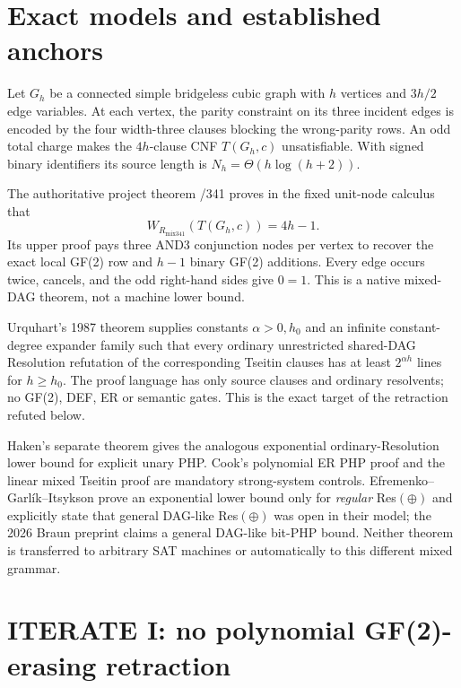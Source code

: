 \documentclass[11pt]{article}
\begin{document}
\section{Exact models and established anchors}

Let $G_h$ be a connected simple bridgeless cubic graph with $h$ vertices and $3h/2$ edge variables.  At each vertex, the parity constraint on its three incident edges is encoded by the four width-three clauses blocking the wrong-parity rows.  An odd total charge makes the $4h$-clause CNF $T(G_h,c)$ unsatisfiable.  With signed binary identifiers its source length is $N_h=\Theta(h\log(h+2))$.

The authoritative project theorem /341 proves in the fixed unit-node calculus that
\[
W_{R_{\mathrm{mix341}}}(T(G_h,c))=4h-1.
\]
Its upper proof pays three AND3 conjunction nodes per vertex to recover the exact local GF(2) row and $h-1$ binary GF(2) additions.  Every edge occurs twice, cancels, and the odd right-hand sides give $0=1$.  This is a native mixed-DAG theorem, not a machine lower bound.

Urquhart's 1987 theorem supplies constants $\alpha>0,h_0$ and an infinite constant-degree expander family such that every ordinary unrestricted shared-DAG Resolution refutation of the corresponding Tseitin clauses has at least $2^{\alpha h}$ lines for $h\ge h_0$.  The proof language has only source clauses and ordinary resolvents; no GF(2), DEF, ER or semantic gates.  This is the exact target of the retraction refuted below.

Haken's separate theorem gives the analogous exponential ordinary-Resolution lower bound for explicit unary PHP.  Cook's polynomial ER PHP proof and the linear mixed Tseitin proof are mandatory strong-system controls.  Efremenko--Garl\'ik--Itsykson prove an exponential lower bound only for \emph{regular} Res$(\oplus)$ and explicitly state that general DAG-like Res$(\oplus)$ was open in their model; the 2026 Braun preprint claims a general DAG-like bit-PHP bound.  Neither theorem is transferred to arbitrary SAT machines or automatically to this different mixed grammar.

\section{ITERATE I: no polynomial GF(2)-erasing retraction}
\end{document}
